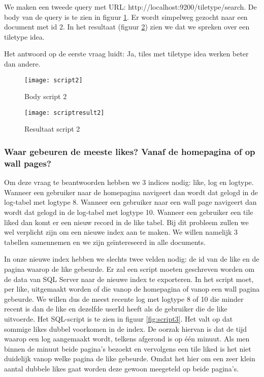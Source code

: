 We maken een tweede query met URL: http://localhost:9200/tiletype/\textunderscore search. De body van de query is te zien in figuur \ref{fig:script2}. Er wordt simpelweg gezocht naar een document met id 2. In het resultaat (figuur \ref{fig:scriptresult2}) zien we dat we spreken over een tiletype idea.

Het antwoord op de eerste vraag luidt: Ja, tiles met tiletype idea werken beter dan andere.

\begin{figure}
	\centering
	\texttt{[image: script2]}
	\caption{Body script 2}
	\label{fig:script2}
\end{figure}

\begin{figure}
	\centering
	\texttt{[image: scriptresult2]}
	\caption{Resultaat script 2}
	\label{fig:scriptresult2}
\end{figure}

\subsubsection{Waar gebeuren de meeste likes? Vanaf de homepagina of op wall pages?}
Om deze vraag te beantwoorden hebben we 3 indices nodig: like, log en logtype. Wanneer een gebruiker naar de homepagina navigeert dan wordt dat gelogd in de log-tabel met logtype 8. Wanneer een gebruiker naar een wall page navigeert dan wordt dat gelogd in de log-tabel met logtype 10. Wanneer een gebruiker een tile liked dan komt er een nieuw record in de like tabel. Bij dit probleem zullen we wel verplicht zijn om een nieuwe index aan te maken. We willen namelijk 3 tabellen samennemen en we zijn geïntereseerd in alle documents.

In onze nieuwe index hebben we slechts twee velden nodig: de id van de like en de pagina waarop de like gebeurde. Er zal een script moeten geschreven worden om de data van SQL Server naar de nieuwe index te exporteren. In het script moet, per like, uitgemaakt worden of die vanop de homepagina of vanop een wall pagina gebeurde. We willen dus de meest recente log met logtype 8 of 10 die minder recent is dan de like en dezelfde userId heeft als de gebruiker die de like uitvoerde. Het SQL-script is te zien in figuur \ref{fig:script3}. Het valt op dat sommige likes dubbel voorkomen in de index. De oorzak hiervan is dat de tijd waarop een log aangemaakt wordt, telkens afgerond is op één minuut. Als men binnen de minuut beide pagina's bezoekt en vervolgens een tile liked is het niet duidelijk vanop welke pagina de like gebeurde. Omdat het hier om een zeer klein aantal dubbele likes gaat worden deze gewoon meegeteld op beide pagina's.


